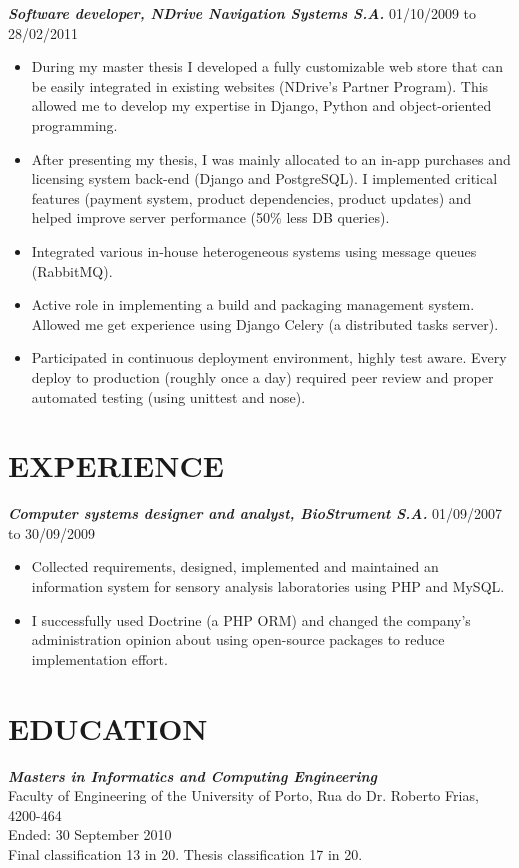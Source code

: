 \documentclass[line,margin]{resume}
\begin{document}
\begin{resume}
    {\sl\bf Software developer, NDrive Navigation Systems S.A.} \hfill 01/10/2009 to 28/02/2011
     \begin{itemize}
         \item During my master thesis I developed a fully customizable web store that can be easily integrated in existing websites (NDrive's Partner Program). This allowed me to develop my expertise in Django, Python and object-oriented programming.
         \item After presenting my thesis, I was mainly allocated to an in-app purchases and licensing system back-end (Django and PostgreSQL). I implemented critical features (payment system, product dependencies, product updates) and helped improve server performance (50\% less DB queries).
        \item Integrated various in-house heterogeneous systems using message queues (RabbitMQ).
        \item Active role in implementing a build and packaging management system. Allowed me get experience using Django Celery (a distributed tasks server).
        \item Participated in continuous deployment  environment, highly test aware. Every deploy to production (roughly once a day) required peer review and proper automated testing (using unittest and nose).
     \end{itemize}

\section{EXPERIENCE}
    {\sl\bf Computer systems designer and analyst, BioStrument S.A.} \hfill 01/09/2007 to 30/09/2009
     \begin{itemize}
         \item Collected requirements, designed, implemented and maintained an information system for sensory analysis laboratories using PHP and MySQL.
        \item I successfully used Doctrine (a PHP ORM) and changed the company's administration opinion about using open-source packages to reduce implementation effort.
     \end{itemize}

\section{EDUCATION}
    {\sl\bf Masters in Informatics and Computing Engineering}\\
    Faculty of Engineering of the University of Porto, Rua do Dr. Roberto Frias, 4200-464\\
    Ended: 30 September 2010\\
    Final classification 13 in 20. Thesis classification 17 in 20.

\end{resume}
\end{document}
